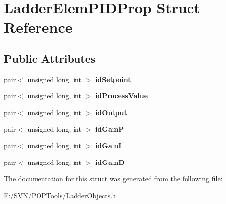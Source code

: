 \hypertarget{struct_ladder_elem_p_i_d_prop}{\section{Ladder\-Elem\-P\-I\-D\-Prop Struct Reference}
\label{struct_ladder_elem_p_i_d_prop}
}
\subsection*{Public Attributes}
\begin{DoxyCompactItemize}
\item 
\hypertarget{struct_ladder_elem_p_i_d_prop_a960ce48c1f836807b9f0b56f8fd48921}{pair$<$ unsigned long, int $>$ {\bfseries id\-Setpoint}}\label{struct_ladder_elem_p_i_d_prop_a960ce48c1f836807b9f0b56f8fd48921}

\item 
\hypertarget{struct_ladder_elem_p_i_d_prop_a92dfc0233414054d9a4487bf35f3fbc0}{pair$<$ unsigned long, int $>$ {\bfseries id\-Process\-Value}}\label{struct_ladder_elem_p_i_d_prop_a92dfc0233414054d9a4487bf35f3fbc0}

\item 
\hypertarget{struct_ladder_elem_p_i_d_prop_a1dcf0a93e53852b5920dcf850a32e07d}{pair$<$ unsigned long, int $>$ {\bfseries id\-Output}}\label{struct_ladder_elem_p_i_d_prop_a1dcf0a93e53852b5920dcf850a32e07d}

\item 
\hypertarget{struct_ladder_elem_p_i_d_prop_a72641b6383c961f31f3e3d581e0dff52}{pair$<$ unsigned long, int $>$ {\bfseries id\-Gain\-P}}\label{struct_ladder_elem_p_i_d_prop_a72641b6383c961f31f3e3d581e0dff52}

\item 
\hypertarget{struct_ladder_elem_p_i_d_prop_ad198dc63b90cd599d1fa8f3804cb068d}{pair$<$ unsigned long, int $>$ {\bfseries id\-Gain\-I}}\label{struct_ladder_elem_p_i_d_prop_ad198dc63b90cd599d1fa8f3804cb068d}

\item 
\hypertarget{struct_ladder_elem_p_i_d_prop_aeb6911d0331a2f6bd898308934ea9dc4}{pair$<$ unsigned long, int $>$ {\bfseries id\-Gain\-D}}\label{struct_ladder_elem_p_i_d_prop_aeb6911d0331a2f6bd898308934ea9dc4}

\end{DoxyCompactItemize}


The documentation for this struct was generated from the following file\-:\begin{DoxyCompactItemize}
\item 
F\-:/\-S\-V\-N/\-P\-O\-P\-Tools/Ladder\-Objects.\-h\end{DoxyCompactItemize}
